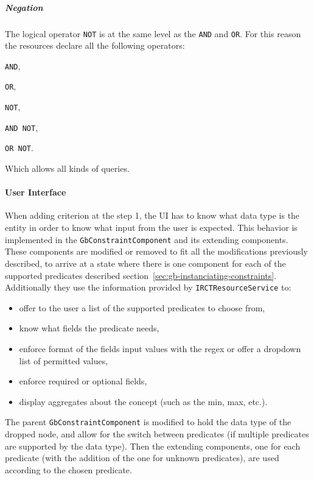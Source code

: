 \subparagraph{Negation}
The logical operator \verb|NOT| is at the same level as the \verb|AND| and \verb|OR|.
For this reason the resources declare all the following operators:
\begin{enumerate*}[label=(\arabic*)]
  \item \verb|AND|,
  \item \verb|OR|,
  \item \verb|NOT|,
  \item \verb|AND NOT|,
  \item \verb|OR NOT|.
\end{enumerate*}
Which allows all kinds of queries.


\paragraph{User Interface}
When adding criterion at the step 1, the UI has to know what data type is the entity in order to know what input from the user is expected.
This behavior is implemented in the \verb|GbConstraintComponent| and its extending components.
These components are modified or removed to fit all the modifications previously described, to arrive at a state where there is one component for each of the supported predicates described section~\ref{sec:gb-instanciating-constraints}.
Additionally they use the information provided by \verb|IRCTResourceService| to:
\begin{itemize}
    \item offer to the user a list of the supported predicates to choose from,
    \item know what fields the predicate needs,
    \item enforce format of the fields input values with the regex or offer a dropdown list of permitted values, 
    \item enforce required or optional fields,
    \item display aggregates about the concept (such as the min, max, etc.).
\end{itemize}

The parent \verb|GbConstraintComponent| is modified to hold the data type of the dropped node, and allow for the switch between predicates (if multiple predicates are supported by the data type).
Then the extending components, one for each predicate (with the addition of the one for unknown predicates), are used according to the chosen predicate.

